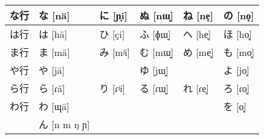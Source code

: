 \documentclass[a4paper]{ctexart}
\newcommand{\ipa}[1]{\footnotesize[{\ipafont#1}]}
\begin{document}
\begin{table}[H]
\begin{tabularx}{4in}{c*{5}{|X}}
    \hline
    な行
      & な \newline \ipa{nä}
      & に \newline \ipa{ɲ̟i}
      & ぬ \newline \ipa{nɯ̟}
      & ね \newline \ipa{ne̞}
      & の \newline \ipa{no̞} \\
    \hline
    は行
      & は \newline \ipa{hä}
      & ひ \newline \ipa{çi}
      & ふ \newline \ipa{ɸɯ̟}
      & へ \newline \ipa{he̞}
      & ほ \newline \ipa{ho̞} \\
    \hline
    ま行
      & ま \newline \ipa{mä}
      & み \newline \ipa{mʲi}
      & む \newline \ipa{mɯ̟}
      & め \newline \ipa{me̞}
      & も \newline \ipa{mo̞} \\
    \hline
    や行
      & や \newline \ipa{jä}
      &
      & ゆ \newline \ipa{jɯ̟}
      &
      & よ \newline \ipa{jo̞} \\
    \hline
    ら行
      & ら \newline \ipa{ɾä}
      & り \newline \ipa{ɾʲi}
      & る \newline \ipa{ɾɯ̟}
      & れ \newline \ipa{ɾe̞}
      & ろ \newline \ipa{ɾo̞} \\
    \hline
    わ行
      & わ \newline \ipa{ɰä}
      &
      &
      &
      & を \newline \ipa{o̞} \\
    \hline
      & ん \newline \ipa{n m ŋ ɲ}
  \end{tabularx}
\end{table}
\end{document}
